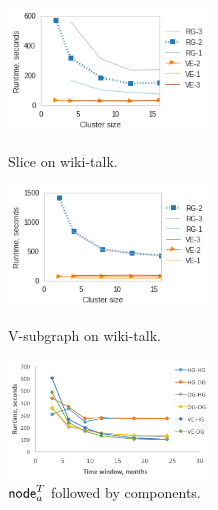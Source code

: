 \begin{figure}[t]
\vspace{-0.2in}
\centering
\begin{minipage}{2.2in}
\centering
\includegraphics[width=2.1in]{figs/slice_wikitalk_scale_build13.png}
\caption{Slice on wiki-talk.}
\label{fig:slicescale}
\vspace{-0.1in}
\end{minipage}
\begin{minipage}{2.2in}
\centering
\includegraphics[width=2.1in]{figs/select_wikitalk_scale_build13.png}
\caption{V-subgraph on wiki-talk.}
\label{fig:selectscale}
\vspace{-0.1in}
\end{minipage}
\begin{minipage}{2.2in}
\centering
\includegraphics[width=2.1in]{figs/switch_cc.png}
\caption{$\textsf{node}^T_a$ followed by components.}
\label{fig:ncrtocc}
\vspace{-0.1in}
\end{minipage}
\end{figure}


